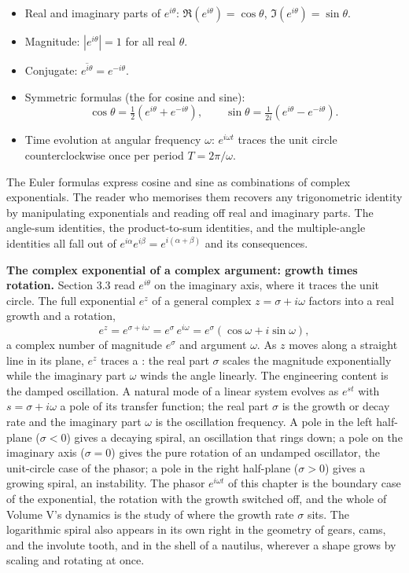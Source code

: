 \begin{itemize}[leftmargin=*]
  \item Real and imaginary parts of $e^{i\theta}$:
    $\Re(e^{i\theta}) = \cos\theta$, $\Im(e^{i\theta}) = \sin\theta$.
  \item Magnitude: $|e^{i\theta}| = 1$ for all real $\theta$.
  \item Conjugate: $\overline{e^{i\theta}} = e^{-i\theta}$.
  \item Symmetric formulas (the  for
    cosine and sine):
    \[
    \cos\theta = \tfrac{1}{2}\left(e^{i\theta} + e^{-i\theta}\right),
    \qquad
    \sin\theta = \tfrac{1}{2i}\left(e^{i\theta} - e^{-i\theta}\right).
    \]
  \item Time evolution at angular frequency $\omega$:
    $e^{i\omega t}$ traces the unit circle counterclockwise once
    per period $T = 2\pi/\omega$.
\end{itemize}
The Euler formulas express cosine and sine as combinations of
complex exponentials. The reader who memorises them recovers any
trigonometric identity by manipulating exponentials and reading
off real and imaginary parts. The angle-sum identities, the
product-to-sum identities, and the multiple-angle identities all
fall out of $e^{i\alpha} e^{i\beta} = e^{i(\alpha + \beta)}$ and
its consequences.

\begin{mastery}
\textbf{The complex exponential of a complex argument: growth times
rotation.} Section 3.3 read $e^{i\theta}$ on the imaginary axis, where
it traces the unit circle. The full exponential $e^{z}$ of a general
complex $z = \sigma + i\omega$ factors into a real growth and a
rotation,
\[
e^{z} = e^{\sigma + i\omega} = e^{\sigma}\,e^{i\omega}
= e^{\sigma}(\cos\omega + i\sin\omega),
\]
a complex number of magnitude $e^{\sigma}$ and argument $\omega$. As
$z$ moves along a straight line in its plane, $e^{z}$ traces a
: the real part $\sigma$ scales the
magnitude exponentially while the imaginary part $\omega$ winds the
angle linearly. The engineering content is the damped oscillation.
A natural mode of a linear system evolves as $e^{s t}$ with $s = \sigma
+ i\omega$ a pole of its transfer function; the real part $\sigma$ is
the growth or decay rate and the imaginary part $\omega$ is the
oscillation frequency. A pole in the left half-plane ($\sigma < 0$)
gives a decaying spiral, an oscillation that rings down; a pole on the
imaginary axis ($\sigma = 0$) gives the pure rotation of an undamped
oscillator, the unit-circle case of the phasor; a pole in the right
half-plane ($\sigma > 0$) gives a growing spiral, an instability. The
phasor $e^{i\omega t}$ of this chapter is the boundary case of the
exponential, the rotation with the growth switched off, and the whole
of Volume V's dynamics is the study of where the growth rate $\sigma$
sits. The logarithmic spiral also appears in its own right in the
geometry of gears, cams, and the involute tooth, and in the shell of a
nautilus, wherever a shape grows by scaling and rotating at once.
\end{mastery}

